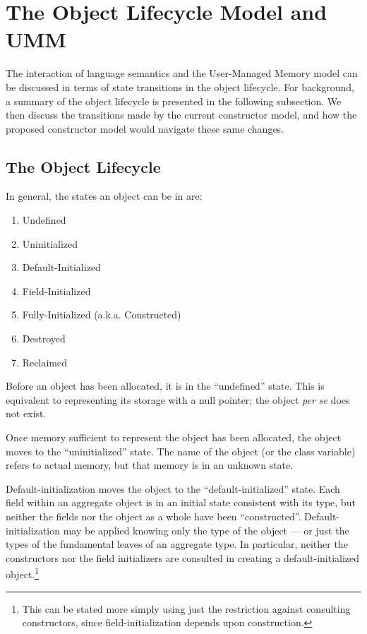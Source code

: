 \section{The Object Lifecycle Model and UMM}
\label{Objects}


The interaction of language semantics and the User-Managed Memory model can be discussed
in terms of state transitions in the object lifecycle.  For background, a summary of the
object lifecycle is presented in the following subsection.  We then discuss the
transitions made by the current constructor model, and how the proposed constructor model
would navigate these same changes.


\subsection{The Object Lifecycle}

In general, the states an object can be in are:
\begin{enumerate}
\item Undefined
\item Uninitialized
\item Default-Initialized
\item Field-Initialized
\item Fully-Initialized (a.k.a. Constructed)
\item Destroyed
\item Reclaimed
\end{enumerate}

Before an object has been allocated, it is in the ``undefined'' state.  This is
equivalent to representing its storage with a null pointer; the object {\it per
se} does not exist.

Once memory sufficient to represent the object has been allocated, the object
moves to the ``uninitialized'' state.  The name of the object (or the class
variable) refers to actual memory, but that memory is in an unknown state.

Default-initialization moves the object to the ``default-initialized'' state.  Each
field within an aggregate object is in an initial state consistent with its type,
but neither the fields nor the object as a whole have been ``constructed''.
Default-initialization may be applied knowing only the type of the object --- or
just the types of the fundamental leaves of an aggregate type.  In particular,
neither the constructors nor the field initializers are consulted in creating a
default-initialized object.\footnote{This can be stated more simply using just the
  restriction against consulting constructors, since field-initialization
  depends upon construction.}

